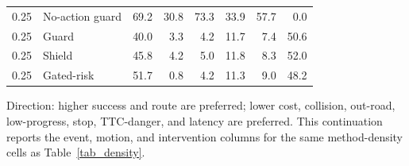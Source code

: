 \begin{table}[!htbp]
\begin{tabular}{@{}llrrrrrr@{}}
0.25 & No-action guard & 69.2 & 30.8 & 73.3 & 33.9 & 57.7 & 0.0 \\
0.25 & Guard & 40.0 & 3.3 & 4.2 & 11.7 & 7.4 & 50.6 \\
0.25 & Shield & 45.8 & 4.2 & 5.0 & 11.8 & 8.3 & 52.0 \\
0.25 & Gated-risk & 51.7 & 0.8 & 4.2 & 11.3 & 9.0 & 48.2 \\
\bottomrule
\end{tabular}
\begin{tablenotes}
\item Direction: higher success and route are preferred; lower cost, collision, out-road, low-progress, stop, TTC-danger, and latency are preferred. This continuation reports the event, motion, and intervention columns for the same method-density cells as Table~\ref{tab_density}.
\end{tablenotes}
\end{table}
